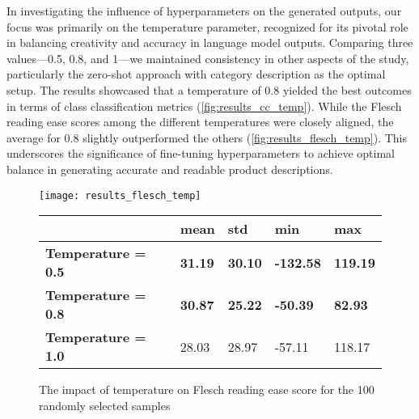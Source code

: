 In investigating the influence of hyperparameters on the generated outputs, our focus was primarily on the temperature parameter, recognized for its pivotal role in balancing creativity and accuracy in language model outputs. Comparing three values—0.5, 0.8, and 1—we maintained consistency in other aspects of the study, particularly the zero-shot approach with category description as the optimal setup. The results showcased that a temperature of 0.8 yielded the best outcomes in terms of class classification metrics (\autoref{fig:results_cc_temp}). While the Flesch reading ease scores among the different temperatures were closely aligned, the average for 0.8 slightly outperformed the others (\autoref{fig:results_flesch_temp}). This underscores the significance of fine-tuning hyperparameters to achieve optimal balance in generating accurate and readable product descriptions.




\begin{figure}[H]
	\centering
	\texttt{[image: results\_flesch\_temp]}
	\begin{tabular}{|l|l|l|l|l|}
		\hline
		\textbf{} & \textbf{mean} & \textbf{std} & \textbf{min} & \textbf{max} \\ \hline
		\textbf{Temperature = 0.5} & \textbf{31.19} & \textbf{30.10} & \textbf{-132.58} & \textbf{119.19} \\ \hline
		\textbf{Temperature = 0.8} & \textbf{30.87} & \textbf{25.22} & \textbf{-50.39} & \textbf{82.93} \\ \hline
		\textbf{Temperature = 1.0 } & 28.03  & 28.97  & -57.11  & 118.17 \\ \hline
	\end{tabular}
	\captionsetup{labelformat=andtable}
	\caption{The impact of temperature on Flesch reading ease score for the 100 randomly selected samples}
	\label{fig:results_flesch_temp}
\end{figure}

